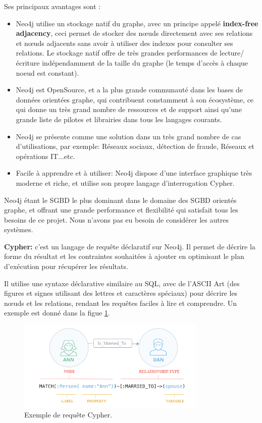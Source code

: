 Ses principaux avantages sont :
\begin{itemize}
	\item Neo4j utilise un stockage natif du graphe, avec un principe appelé \textbf{index-free adjacency}, ceci permet de stocker des nœuds directement avec ses relations et nœuds adjacents sans avoir à utiliser des indexes pour consulter ses relations.\newline
	Le stockage natif offre de très grandes performances de lecture/écriture indépendamment de la taille du graphe (le temps d'accès à chaque noeud est constant).
	\item Neo4j est \gls{OpenSource}, et a la plus grande communauté dans les bases de données orientées graphe, qui contribuent constamment à son écosystème, ce qui donne un très grand nombre de ressources et de support ainsi qu'une grande liste de pilotes et librairies dans tous les langages courants.
	\item Neo4j se présente comme une solution dans un très grand nombre de cas d'utilisations, par exemple: Réseaux sociaux, détection de fraude, Réseaux et opérations IT...etc.
	\item Facile à apprendre et à utiliser: Neo4j dispose d'une interface graphique très moderne et riche, et utilise son propre langage d'interrogation Cypher.\newline
\end{itemize}

Neo4j étant le SGBD le plus dominant dans le domaine des SGBD orientés graphe, et offrant une grande performance et flexibilité qui satisfait tous les besoins de ce projet. Nous n'avons pas eu besoin de considérer les autres systèmes.

\textbf{Cypher: } c'est un langage de requête déclaratif sur Neo4j. Il permet de décrire la forme du résultat et les contraintes souhaitées à ajouter en optimisant le plan d'exécution pour récupérer les résultats.\newline

Il utilise une syntaxe déclarative similaire au SQL, avec de l'ASCII Art (des figures et signes utilisant des lettres et caractères spéciaux) pour décrire les nœuds et les relations, rendant les requêtes faciles à lire et comprendre. Un exemple est donné dans la figue \ref{fig:cypher}.

\begin{figure}
	\center
	\includegraphics[width=0.8\textwidth]{img/cypher.png}
	\caption{Exemple de requête Cypher.}
	\label{fig:cypher}
\end{figure}

